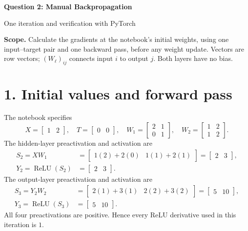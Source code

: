 \documentclass[11pt]{article}
\newcommand{\relu}{\operatorname{ReLU}}
\begin{document}
\begin{center}
{\Large\bfseries Question 2: Manual Backpropagation}\par
{\large One iteration and verification with PyTorch}
\end{center}

\textbf{Scope.} Calculate the gradients at the notebook's initial weights,
using one input--target pair and one backward pass, before any weight update.
Vectors are row vectors; $(W_\ell)_{ij}$ connects input $i$ to output $j$.
Both layers have no bias.

\section*{1. Initial values and forward pass}
The notebook specifies
\[
X=\begin{bmatrix}1&2\end{bmatrix},\quad
T=\begin{bmatrix}0&0\end{bmatrix},\quad
W_1=\begin{bmatrix}2&1\\0&1\end{bmatrix},\quad
W_2=\begin{bmatrix}1&2\\1&2\end{bmatrix}.
\]
The hidden-layer preactivation and activation are
\begin{align*}
S_2=XW_1
 &=\begin{bmatrix}1(2)+2(0)&1(1)+2(1)\end{bmatrix}
 =\begin{bmatrix}2&3\end{bmatrix},\\
Y_2=\relu(S_2)&=\begin{bmatrix}2&3\end{bmatrix}.
\end{align*}
The output-layer preactivation and activation are
\begin{align*}
S_3=Y_2W_2
 &=\begin{bmatrix}2(1)+3(1)&2(2)+3(2)\end{bmatrix}
 =\begin{bmatrix}5&10\end{bmatrix},\\
Y_3=\relu(S_3)&=\begin{bmatrix}5&10\end{bmatrix}.
\end{align*}
All four preactivations are positive. Hence every ReLU derivative used in
this iteration is $1$.
\end{document}
